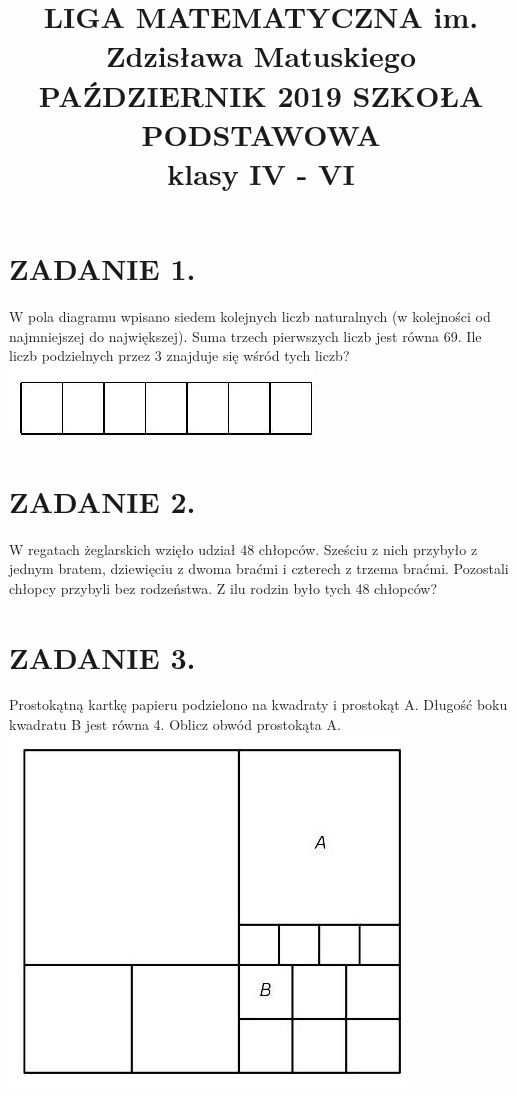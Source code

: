 \documentclass[10pt]{article}
\title{LIGA MATEMATYCZNA im. Zdzisława Matuskiego PAŹDZIERNIK 2019 SZKOŁA PODSTAWOWA \\
 klasy IV - VI }
\author{}
\date{}
\begin{document}
\maketitle
\section*{ZADANIE 1.}
W pola diagramu wpisano siedem kolejnych liczb naturalnych (w kolejności od najmniejszej do największej). Suma trzech pierwszych liczb jest równa 69. Ile liczb podzielnych przez 3 znajduje się wśród tych liczb?\\
\includegraphics[max width=\textwidth, center]{2024_11_21_a97cad5a8f63b3478346g-1}

\section*{ZADANIE 2.}
W regatach żeglarskich wzięło udział 48 chłopców. Sześciu z nich przybyło z jednym bratem, dziewięciu z dwoma braćmi i czterech z trzema braćmi. Pozostali chłopcy przybyli bez rodzeństwa. Z ilu rodzin było tych 48 chłopców?

\section*{ZADANIE 3.}
Prostokątną kartkę papieru podzielono na kwadraty i prostokąt A. Długość boku kwadratu B jest równa 4. Oblicz obwód prostokąta A.\\
\includegraphics[max width=\textwidth, center]{2024_11_21_a97cad5a8f63b3478346g-1(1)}
\end{document}
